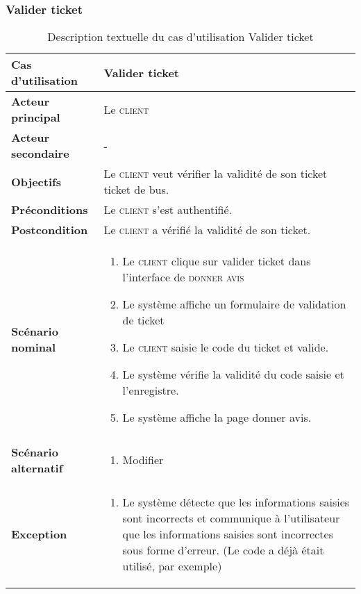         \subsubsection[Valider ticket]{Valider ticket}
        \begin{longtable}{p{4cm} p{9cm}}
            \caption{Description textuelle du cas d’utilisation Valider ticket}
            \label{table:usecaseScannerJ}
            \\\hline\hline
                \textbf{Cas d’utilisation} & \textbf{Valider ticket}
            \\\hline\hline
                    \textbf{Acteur principal} & Le \textsc{client}
                \\
                    \textbf{Acteur secondaire} & -
                \\
                    \textbf{Objectifs} & Le \textsc{client} veut vérifier la
                    validité de son ticket ticket de bus.
                \\
                    \textbf{Préconditions} & Le \textsc{client} s’est authentifié.
                \\
                    \textbf{Postcondition} & Le \textsc{client} a vérifié la validité de son ticket.
                \\
                \textbf{Scénario nominal} &
                    \begin{enumerate}[leftmargin=*]
                        \item Le \textsc{client} clique sur valider ticket dans
                        l’interface de \textsc{donner avis}
                        \item Le système affiche un formulaire de validation de ticket
                        \item Le \textsc{client} saisie le code du ticket et valide.
                        \item Le système vérifie la validité du code saisie et l’enregistre.
                        \item Le système affiche la page donner avis.
                    \end{enumerate}
                \\
                \textbf{Scénario alternatif} &
                    \begin{enumerate}[leftmargin=*]
                        \item Modifier
                    \end{enumerate}
                \\
                \textbf{Exception} &
                \begin{enumerate}[leftmargin=*]
                        \item Le système détecte que les informations saisies sont incorrects et communique à
                        l’utilisateur que les informations saisies sont incorrectes sous forme d’erreur.
                        (Le code a déjà était utilisé, par exemple)
                    \end{enumerate}
            \\\bottomrule
        \end{longtable}


